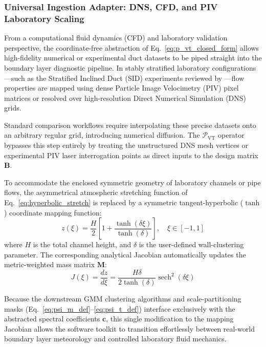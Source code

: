 \subsubsection{Universal Ingestion Adapter: DNS, CFD, and PIV Laboratory Scaling}
\label{sec:extensions:cfd_ingest}

From a computational fluid dynamics (CFD) and laboratory validation perspective, the coordinate-free abstraction of Eq.~\ref{eq:p_vt_closed_form} allows high-fidelity numerical or experimental duct datasets to be piped straight into the boundary layer diagnostic pipeline. In stably stratified laboratory configurations—such as the Stratified Inclined Duct (SID) experiments reviewed by \citet{Lefauve2025}—flow properties are mapped using dense Particle Image Velocimetry (PIV) pixel matrices or resolved over high-resolution Direct Numerical Simulation (DNS) grids.

Standard comparison workflows require interpolating these precise datasets onto an arbitrary regular grid, introducing numerical diffusion. The $\mathcal{P}_{\mathrm{VT}}$ operator bypasses this step entirely by treating the unstructured DNS mesh vertices or experimental PIV laser interrogation points as direct inputs to the design matrix $\mathbf{B}$.

To accommodate the enclosed symmetric geometry of laboratory channels or pipe flows, the asymmetrical atmospheric stretching function of Eq.~\ref{eq:hyperbolic_stretch} is replaced by a symmetric tangent-hyperbolic ($\tanh$) coordinate mapping function:
\begin{equation}
z(\xi) = \frac{H}{2} \left[ 1 + \frac{\tanh(\delta \xi)}{\tanh(\delta)} \right], \quad \xi \in [-1, 1]
\label{eq:tanh_stretch}
\end{equation}
where $H$ is the total channel height, and $\delta$ is the user-defined wall-clustering parameter. The corresponding analytical Jacobian automatically updates the metric-weighted mass matrix $\mathbf{M}$:
\begin{equation}
J(\xi) = \frac{dz}{d\xi} = \frac{H \delta}{2 \tanh(\delta)} \operatorname{sech}^2(\delta \xi)
\label{eq:jacobian_tanh}
\end{equation}

Because the downstream GMM clustering algorithms and scale-partitioning masks (Eq.~\ref{eq:psi_m_def}--\ref{eq:psi_t_def}) interface exclusively with the abstracted spectral coefficients $\mathbf{c}$, this single modification to the mapping Jacobian allows the software toolkit to transition effortlessly between real-world boundary layer meteorology and controlled laboratory fluid mechanics.

